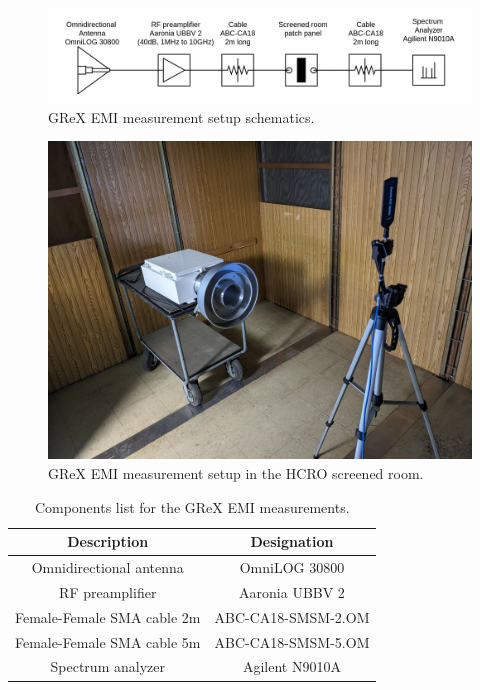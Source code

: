 \documentclass[12pt,a4paper,oneside]{article}
\begin{document}
\begin{figure}[H]
\centering
\includegraphics[width=1\linewidth]{Figures/measurement_setup_schematics.png}
\caption{GReX EMI measurement setup schematics.}
\label{fig:measurement_setup_schematics}
\end{figure}
%
\begin{figure}[H]
\centering
\includegraphics[width=0.8\linewidth]{Figures/screened_room_setup.jpeg}
\caption{GReX EMI measurement setup in the HCRO screened room.}
\label{fig:screened_room_setup}
\end{figure}
%
\begin{table}[]
    \centering
   
    \begin{tabular}{|c|c|}
    \hline
         \cellcolor[gray]{0.85} Description & \cellcolor[gray]{0.85} Designation \\ \hline
         Omnidirectional antenna & OmniLOG 30800\\ \hline
         RF preamplifier & Aaronia UBBV 2\\ \hline
         Female-Female SMA cable 2m & ABC-CA18-SMSM-2.OM\\ \hline
         Female-Female SMA cable 5m & ABC-CA18-SMSM-5.OM\\ \hline
         Spectrum analyzer & Agilent N9010A\\ \hline
    \end{tabular}
    \caption{Components list for the GReX EMI measurements.}
    \label{tab:setup_component_list}
\end{table}
\end{document}
